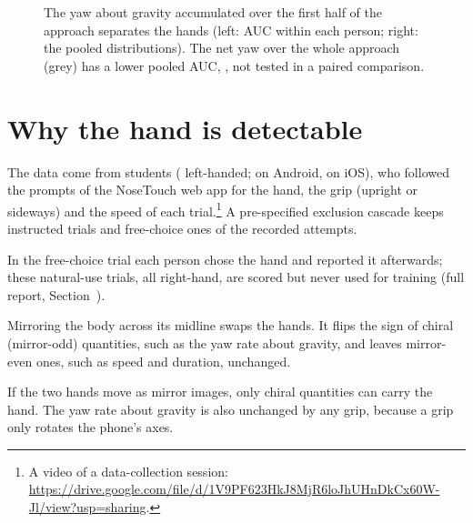 \begin{figure}[tbp]
\centering
{}
\caption{The yaw about gravity accumulated over the first half of the approach separates the hands (left: AUC within
each person; right: the pooled distributions). The net yaw over the whole approach (grey) has a lower pooled AUC,
, not tested in a paired comparison.}
\label{fig:S2_13_first_half_yaw}
\end{figure}

\section{Why the hand is detectable}\label{sec:physics}
The data come from  students ( left-handed;
 on Android,  on iOS), who followed the prompts of the NoseTouch
web app for the hand, the grip (upright or sideways) and the speed of each trial.\footnote{\raggedright A video of a
data-collection session: \url{https://drive.google.com/file/d/1V9PF623HkJ8MjR6loJhUHnDkCx60W-Jl/view?usp=sharing}.}
A pre-specified exclusion cascade keeps
 instructed trials and  free-choice ones of the
 recorded attempts.

In the free-choice trial each person chose the hand and reported it afterwards; these natural-use trials, all
right-hand, are scored but never used for training (full report, Section~).

Mirroring the body across its midline swaps the hands. It flips the sign of chiral (mirror-odd) quantities, such as
the yaw rate about gravity, and leaves mirror-even ones, such as speed and duration, unchanged.

If the two hands move as mirror images, only chiral quantities can carry the hand. The yaw rate about gravity is also
unchanged by any grip, because a grip only rotates the phone's axes.

